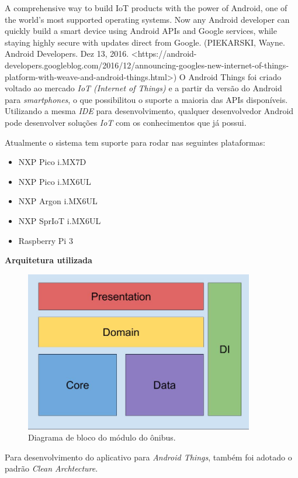 \documentclass[
	12pt,				%
	oneside,			%
	a4paper,			%
	brazil				%
]{abntex2}
\begin{document}
{A comprehensive way to build IoT products with the power of Android, one of the world's most supported operating systems. Now any Android developer can quickly build a smart device using Android APIs and Google services, while staying highly secure with updates direct from Google. (PIEKARSKI, Wayne. Android Developers. Dez 13, 2016. <https://android-developers.googleblog.com/2016/12/announcing-googles-new-internet-of-things-platform-with-weave-and-android-things.html>)
O Android Things foi criado voltado ao mercado \textit{IoT (Internet of Things)} e a partir da versão do Android para \textit{smartphones}, o que possibilitou o suporte a maioria das APIs disponíveis. Utilizando a mesma \textit{IDE} para desenvolvimento, qualquer desenvolvedor Android pode desenvolver soluções \textit{IoT} com os conhecimentos que já possui.

Atualmente o sistema tem suporte para rodar nas seguintes plataformas:

\begin{itemize}
\item NXP Pico i.MX7D
\item NXP Pico i.MX6UL
\item NXP Argon i.MX6UL
\item NXP SprIoT i.MX6UL
\item Raspberry Pi 3
\end{itemize}

\newpage

\textbf{Arquitetura utilizada}

\begin{figure}[H]
\centering
\includegraphics[width=10cm, center]{images/brick_diagram_bus_tracker}
\caption{Diagrama de bloco do módulo do ônibus.}
\label{Rotulo}
\end{figure}

Para desenvolvimento do aplicativo para \textit{Android Things}, também foi adotado o padrão \textit{Clean Archtecture}. 

}
\end{document}
